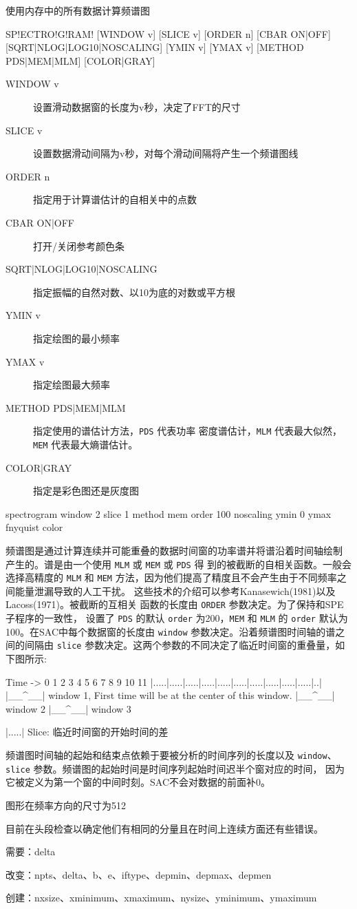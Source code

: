 \label{cmd:spectrogram}

使用内存中的所有数据计算频谱图

\begin{SACSTX}
SP!ECTRO!G!RAM! [WINDOW v] [SLICE v] [ORDER n] [CBAR ON|OFF]
    [SQRT|NLOG|LOG10|NOSCALING] [YMIN v] [YMAX v] [METHOD PDS|MEM|MLM]
    [COLOR|GRAY]
\end{SACSTX}

\begin{description}
\item [WINDOW v] 设置滑动数据窗的长度为v秒，决定了FFT的尺寸
\item [SLICE v] 设置数据滑动间隔为v秒，对每个滑动间隔将产生一个频谱图线
\item [ORDER n] 指定用于计算谱估计的自相关中的点数
\item [CBAR ON|OFF] 打开/关闭参考颜色条
\item [SQRT|NLOG|LOG10|NOSCALING] 指定振幅的自然对数、以10为底的对数或平方根
\item [YMIN v] 指定绘图的最小频率
\item [YMAX v] 指定绘图最大频率
\item [METHOD PDS|MEM|MLM] 指定使用的谱估计方法，\texttt{PDS} 代表功率
    密度谱估计，\texttt{MLM} 代表最大似然，\texttt{MEM} 代表最大熵谱估计。
\item [COLOR|GRAY] 指定是彩色图还是灰度图
\end{description}

\begin{SACDFT}
spectrogram window 2 slice 1 method mem order 100 noscaling
    ymin 0 ymax fnyquist color
\end{SACDFT}

频谱图是通过计算连续并可能重叠的数据时间窗的功率谱并将谱沿着时间轴绘制
产生的。谱是由一个使用 \texttt{MLM} 或 \texttt{MEM} 或 \texttt{PDS} 得
到的被截断的自相关函数。一般会选择高精度的 \texttt{MLM} 和 \texttt{MEM}
方法，因为他们提高了精度且不会产生由于不同频率之间能量泄漏导致的人工干扰。
这些技术的介绍可以参考Kanasewich(1981)以及Lacoss(1971)。被截断的互相关
函数的长度由 \texttt{ORDER} 参数决定。为了保持和SPE子程序的一致性，
设置了 \texttt{PDS} 的默认 \texttt{order} 为200，\texttt{MEM} 和
\texttt{MLM} 的 \texttt{order} 默认为100。在SAC中每个数据窗的长度由
\texttt{window} 参数决定。沿着频谱图时间轴的谱之间的间隔由 \texttt{slice}
参数决定。这两个参数的不同决定了临近时间窗的重叠量，如下图所示:
\begin{SACCode}
Time ->
0  1  2  3  4  5  6  7  8  9 10 11
|.....|.....|.....|.....|.....|.....|.....|.....|.....|.....|..|
|__^__| window 1, First time will be at the center of this window.
      |__^__| window 2
            |__^__| window 3

|.....| Slice: 临近时间窗的开始时间的差
\end{SACCode}
频谱图时间轴的起始和结束点依赖于要被分析的时间序列的长度以及 \texttt{window}、
\texttt{slice} 参数。频谱图的起始时间是时间序列起始时间迟半个窗对应的时间，
因为它被定义为第一个窗的中间时刻。SAC不会对数据的前面补0。

图形在频率方向的尺寸为512

目前在头段检查以确定他们有相同的分量且在时间上连续方面还有些错误。

需要：delta

改变：npts、delta、b、e、iftype、depmin、depmax、depmen

创建：nxsize、xminimum、xmaximum、nysize、yminimum、ymaximum
